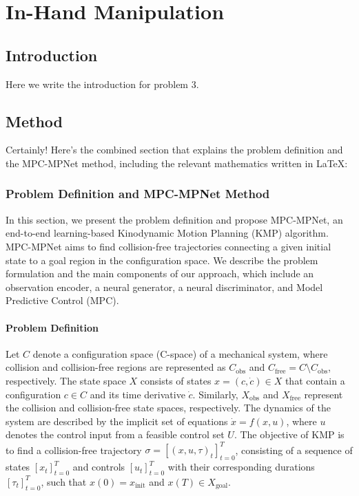 \chapter{In-Hand Manipulation}\label{ch:3-in-hand-manipulation}

\section{Introduction}\label{sec:3-in-hand-manipulation-introduction}
Here we write the introduction for problem 3.


\section{Method}\label{sec:3-in-hand-manipulation-method}

Certainly! Here's the combined section that explains the problem definition and the MPC-MPNet method, including the relevant mathematics written in LaTeX:

\subsection{Problem Definition and MPC-MPNet Method}

In this section, we present the problem definition and propose MPC-MPNet, an end-to-end learning-based Kinodynamic Motion Planning (KMP) algorithm. MPC-MPNet aims to find collision-free trajectories connecting a given initial state to a goal region in the configuration space. We describe the problem formulation and the main components of our approach, which include an observation encoder, a neural generator, a neural discriminator, and Model Predictive Control (MPC).

\subsubsection{Problem Definition}

Let $C$ denote a configuration space (C-space) of a mechanical system, where collision and collision-free regions are represented as $C_{\text{obs}}$ and $C_{\text{free}} = C \setminus C_{\text{obs}}$, respectively. The state space $X$ consists of states $x = (c, \dot{c}) \in X$ that contain a configuration $c \in C$ and its time derivative $\dot{c}$. Similarly, $X_{\text{obs}}$ and $X_{\text{free}}$ represent the collision and collision-free state spaces, respectively. The dynamics of the system are described by the implicit set of equations $ \dot{x} = f(x, u)$, where $u$ denotes the control input from a feasible control set $U$. The objective of KMP is to find a collision-free trajectory $\sigma = \left[(x, u, \tau)_t\right]_{t=0}^{T}$, consisting of a sequence of states $[x_t]_{t=0}^{T}$ and controls $[u_t]_{t=0}^{T}$ with their corresponding durations $[\tau_t]_{t=0}^{T}$, such that $x(0) = x_{\text{init}}$ and $x(T) \in X_{\text{goal}}$.

